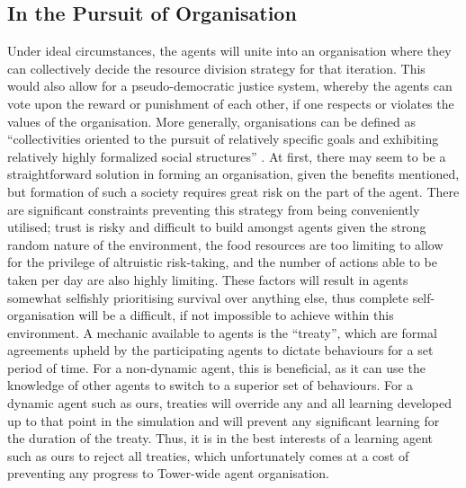 \subsection{In the Pursuit of Organisation}\label{team2-organisation}
Under ideal circumstances, the agents will unite into an organisation where they can collectively decide the resource division strategy for that iteration. This would also allow for a pseudo-democratic justice system, whereby the agents can vote upon the reward or punishment of each other, if one respects or violates the values of the organisation. More generally, organisations can be defined as “collectivities oriented to the pursuit of relatively specific goals and exhibiting relatively highly formalized social structures” \cite{WhettenDavidA1983ORNa}. At first, there may seem to be a straightforward solution in forming an organisation, given the benefits mentioned, but formation of such a society requires great risk on the part of the agent. There are significant constraints preventing this strategy from being conveniently utilised; trust is risky and difficult to build amongst agents given the strong random nature of the environment, the food resources are too limiting to allow for the privilege of altruistic risk-taking, and the number of actions able to be taken per day are also highly limiting. These factors will result in agents somewhat selfishly prioritising survival over anything else, thus complete self-organisation will be a difficult, if not impossible to achieve within this environment. A mechanic available to agents is the “treaty”, which are formal agreements upheld by the participating agents to dictate behaviours for a set period of time. For a non-dynamic agent, this is beneficial, as it can use the knowledge of other agents to switch to a superior set of behaviours. For a dynamic agent such as ours, treaties will override any and all learning developed up to that point in the simulation and will prevent any significant learning for the duration of the treaty. Thus, it is in the best interests of a learning agent such as ours to reject all treaties, which unfortunately comes at a cost of preventing any progress to Tower-wide agent organisation. 
